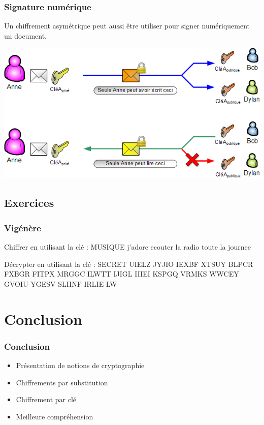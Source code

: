 \documentclass[xcolor={dvipsnames}]{beamer}
\begin{document}
\begin{frame}
\frametitle{Signature numérique}

Un chiffrement asymétrique peut aussi être utiliser pour signer numériquement un document.

\begin{center}
	\includegraphics[scale=0.5]{sign}
\end{center}
\end{frame}

\subsection{Exercices}

\begin{frame}
\frametitle{Vigénère}

\begin{block}{Chiffrer en utilisant la clé : MUSIQUE}
	j'adore ecouter la radio toute la journee
\end{block}

\begin{block}{Décrypter en utilisant la clé : SECRET}
	UIELZ JYJIO IEXBF XTSUY BLPCR FXBGR FITPX MRGGC ILWTT IJIGL IIIEI KSPGQ VRMKS WWCEY GVOIU YGESV SLHNF IRLIE LW
\end{block}
\end{frame}

\section{Conclusion}

\begin{frame}
\frametitle{Conclusion}

\begin{itemize}
	\item Présentation de notions de cryptographie
	\item Chiffrements par substitution
	\item Chiffrement par clé
	\item Meilleure compréhension
\end{itemize}
\end{frame}
\end{document}

